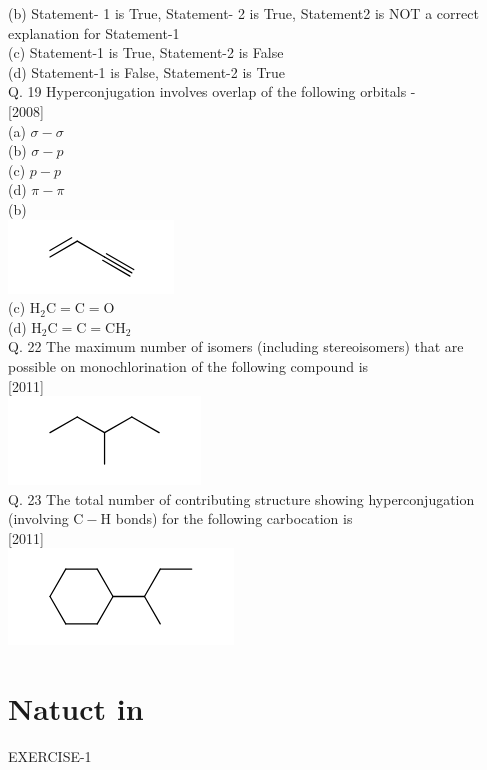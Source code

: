 \documentclass[10pt]{article}
\begin{document}
(b) Statement- 1 is True, Statement- 2 is True, Statement2 is NOT a correct explanation for Statement-1\\
(c) Statement-1 is True, Statement-2 is False\\
(d) Statement-1 is False, Statement-2 is True\\
Q. 19 Hyperconjugation involves overlap of the following orbitals -\\[0pt]
[2008]\\
(a) $\sigma-\sigma$\\
(b) $\sigma-p$\\
(c) $p-p$\\
(d) $\pi-\pi$\\
(b)\\
\includegraphics{smile-866b959e258b021399f490335764d707569b4d81}\\
(c) $\mathrm{H}_{2} \mathrm{C}=\mathrm{C}=\mathrm{O}$\\
(d) $\mathrm{H}_{2} \mathrm{C}=\mathrm{C}=\mathrm{CH}_{2}$\\
Q. 22 The maximum number of isomers (including stereoisomers) that are possible on monochlorination of the following compound is\\[0pt]
[2011]\\
\includegraphics{smile-765f02b007fc82ca99e9c66ee386cebd07598b86}\\
Q. 23 The total number of contributing structure showing hyperconjugation (involving $\mathrm{C}-\mathrm{H}$ bonds) for the following carbocation is\\[0pt]
[2011]\\
\includegraphics{smile-9b3943143cb038e2bfde08ae2528f6e9dcb77035}

\section*{Natuct in}
EXERCISE-1
\end{document}
